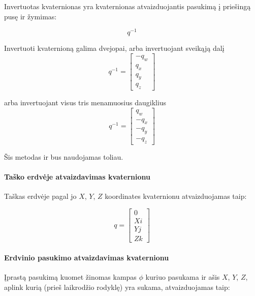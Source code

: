 \documentclass[12pt, a4paper, lithuanian, final]{article}
\begin{document}
Invertuotas kvaternionas yra kvaternionas atvaizduojantis pasukimą į priešingą pusę ir žymimas:

\begin{equation}
	q^{-1}
\end{equation}

Invertuoti kvaternioną galima dvejopai, arba invertuojant sveikąją dalį
\begin{equation}
	q^{-1} = \left[
		\begin{array}{c}
			-q_{w} \\
			q_{x} \\
			q_{y} \\
			q_{z}
		\end{array}
	\right]
\end{equation}

arba invertuojant visus tris menamuosius daugiklius
\begin{equation}
	q^{-1} = \left[
		\begin{array}{c}
			q_{w} \\
			-q_{x} \\
			-q_{y} \\
			-q_{z}
		\end{array}
	\right]
\end{equation}

Šis metodas ir bus naudojamas toliau.


\paragraph{Taško erdvėje atvaizdavimas kvaternionu}

Taškas erdvėje pagal jo $X$, $Y$, $Z$ koordinates kvaternionu atvaizduojamas taip:

\begin{equation}
	q = \left[
		\begin{array}{c}
			0\\
			Xi\\
			Yj\\
			Zk
		\end{array}
	\right]
\end{equation}


\paragraph{Erdvinio pasukimo atvaizdavimas kvaternionu}

Įprastą pasukimą kuomet žinomas kampas $\phi$ kuriuo pasukama ir ašis $X$, $Y$, $Z$, aplink kurią (prieš laikrodžio rodyklę) yra sukama, atvaizduojamas taip:
\end{document}
